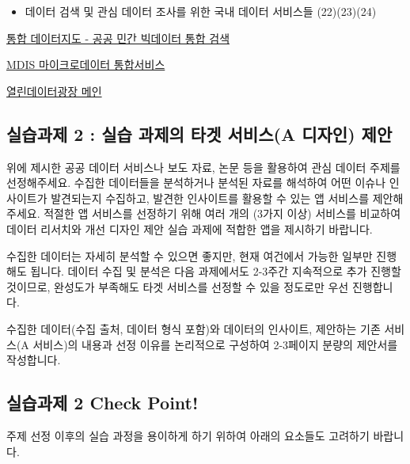 \documentclass[
  letterpaper,
]{book}
\providecommand{\tightlist}{%
  \setlength{\itemsep}{0pt}\setlength{\parskip}{0pt}}\usepackage{longtable,booktabs,array}
\begin{document}
\begin{itemize}
\tightlist
\item
  데이터 검색 및 관심 데이터 조사를 위한 국내 데이터 서비스들
  (22)(23)(24)
\end{itemize}

\href{https://www.bigdata-map.kr}{통합 데이터지도 - 공공 민간 빅데이터
통합 검색}

\href{https://mdis.kostat.go.kr/index.do}{MDIS 마이크로데이터
통합서비스}

\href{https://data.seoul.go.kr}{열린데이터광장 메인}

\subsection{실습과제 2 : 실습 과제의 타겟 서비스(A 디자인)
제안}\label{uxc2e4uxc2b5uxacfcuxc81c-2-uxc2e4uxc2b5-uxacfcuxc81cuxc758-uxd0c0uxac9f-uxc11cuxbe44uxc2a4a-uxb514uxc790uxc778-uxc81cuxc548}

위에 제시한 공공 데이터 서비스나 보도 자료, 논문 등을 활용하여 관심
데이터 주제를 선정해주세요. 수집한 데이터들을 분석하거나 분석된 자료를
해석하여 어떤 이슈나 인사이트가 발견되는지 수집하고, 발견한 인사이트를
활용할 수 있는 앱 서비스를 제안해주세요. 적절한 앱 서비스를 선정하기
위해 여러 개의 (3가지 이상) 서비스를 비교하여 데이터 리서치와 개선
디자인 제안 실습 과제에 적합한 앱을 제시하기 바랍니다.

수집한 데이터는 자세히 분석할 수 있으면 좋지만, 현재 여건에서 가능한
일부만 진행해도 됩니다. 데이터 수집 및 분석은 다음 과제에서도 2-3주간
지속적으로 추가 진행할 것이므로, 완성도가 부족해도 타겟 서비스를 선정할
수 있을 정도로만 우선 진행합니다.

수집한 데이터(수집 출처, 데이터 형식 포함)와 데이터의 인사이트, 제안하는
기존 서비스(A 서비스)의 내용과 선정 이유를 논리적으로 구성하여 2-3페이지
분량의 제안서를 작성합니다.

\subsection{실습과제 2 Check
Point!}\label{uxc2e4uxc2b5uxacfcuxc81c-2-check-point}

주제 선정 이후의 실습 과정을 용이하게 하기 위하여 아래의 요소들도
고려하기 바랍니다.
\end{document}
